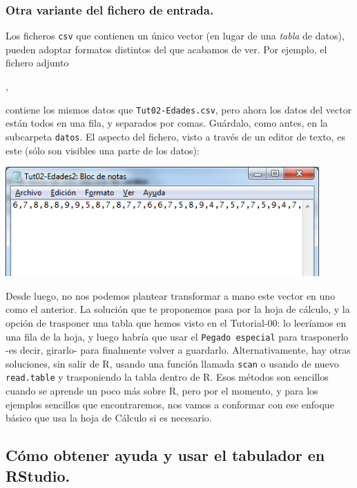 \documentclass[10pt,a4paper]{article}\usepackage[]{graphicx}\usepackage[]{color}
\newcounter {cont01}
\begin{document}
\subsubsection*{Otra variante del fichero de entrada.}
\label{tut02:subsubsec:OtraVarianteFicheroEntrada}

Los ficheros {\tt  csv} que contienen un único vector (en lugar de una {\em tabla} de datos), pueden adoptar formatos distintos del que acabamos de ver. Por ejemplo, el fichero adjunto
\begin{center}
  ,
\end{center}
contiene los mismos datos que {\tt Tut02-Edades.csv}, pero ahora los datos del vector están todos en una fila, y separados por comas. Guárdalo, como antes, en la subcarpeta {\tt datos}. El aspecto del fichero, visto a través de un editor de texto, es este (sólo son visibles una parte de los datos):
    \begin{center}
    \includegraphics[width=12cm]{../fig/Tut02-07a.png}
    \end{center}
Desde luego, no nos podemos plantear transformar a mano este vector en uno como el anterior. La solución que te proponemos pasa por la hoja de cálculo, y la opción de trasponer una tabla que hemos visto en el Tutorial-00: lo leeríamos en una fila de la hoja, y luego habría que usar el {\tt Pegado especial} para trasponerlo -es decir, girarlo- para finalmente volver a guardarlo. Alternativamente, hay otras soluciones, sin salir de R, usando una función llamada {\tt scan} o usando de nuevo {\tt read.table} y trasponiendo la tabla dentro de R. Esos métodos son sencillos cuando se aprende un poco más sobre R, pero por el momento, y para los ejemplos sencillos que encontraremos, nos vamos a conformar con ese enfoque básico que usa la hoja de Cálculo si es necesario.

\subsection{Cómo obtener ayuda y usar el tabulador en RStudio.}
\end{document}
